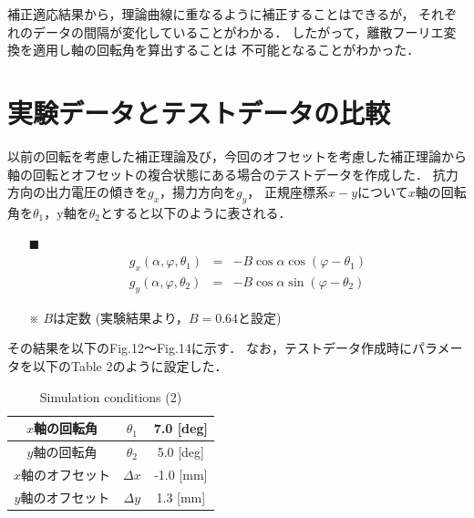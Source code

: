 \documentclass[twocolumn,a4j]{jsarticle}
\begin{document}
補正適応結果から，理論曲線に重なるように補正することはできるが，
それぞれのデータの間隔が変化していることがわかる．
したがって，離散フーリエ変換を適用し軸の回転角を算出することは
不可能となることがわかった．

\newpage

\section{実験データとテストデータの比較}

以前の回転を考慮した補正理論及び，今回のオフセットを考慮した補正理論から
軸の回転とオフセットの複合状態にある場合のテストデータを作成した．
抗力方向の出力電圧の傾きを$g_x$，揚力方向を$g_y$，
正規座標系$x-y$について$x$軸の回転角を$\theta_1$，y軸を$\theta_2$とすると以下のように表される．

\begin{itemize}
    \item [$\blacksquare$] 
          \begin{eqnarray*}
              g_x(\alpha , \varphi , \theta_1) &=& - B \cos \alpha \cos \left(\varphi - \theta_1\right) \\
              g_y(\alpha , \varphi , \theta_2) &=& - B \cos \alpha \sin \left(\varphi - \theta_2\right)
          \end{eqnarray*}
    \item [※] $B$は定数 (実験結果より，$B=0.64$と設定)
\end{itemize}

その結果を以下のFig.12～Fig.14に示す．
なお，テストデータ作成時にパラメータを以下のTable 2のように設定した．

\begin{table}[htbp]
    \begin{center}
        \caption{Simulation conditions (2)}
        \begin{tabular}{|p{30mm}|p{20mm}|p{30mm}|}
            \hline
            \multicolumn{1}{|c|}{$x$軸の回転角}     & \multicolumn{1}{|c|}{$\theta_1$} & \multicolumn{1}{|c|}{7.0 [deg]} \\ \hline
            \multicolumn{1}{|c|}{$y$軸の回転角}     & \multicolumn{1}{|c|}{$\theta_2$} & \multicolumn{1}{|c|}{5.0 [deg]} \\ \hline
            \multicolumn{1}{|c|}{$x$軸のオフセット} & \multicolumn{1}{|c|}{$\Delta x$} & \multicolumn{1}{|c|}{-1.0 [mm]} \\ \hline
            \multicolumn{1}{|c|}{$y$軸のオフセット} & \multicolumn{1}{|c|}{$\Delta y$} & \multicolumn{1}{|c|}{1.3 [mm]}  \\ \hline
        \end{tabular}
    \end{center}
\end{table}
\end{document}
